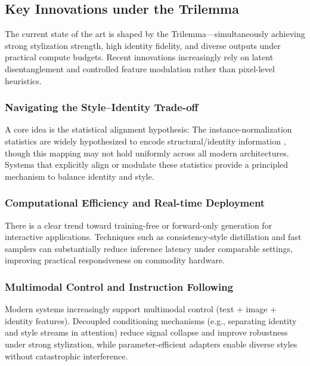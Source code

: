 \documentclass[journal]{IEEEtran}
\begin{document}
\subsection{Key Innovations under the Trilemma}
\label{sec:evaluation:innovations}
The current state of the art is shaped by the Trilemma---simultaneously achieving strong stylization strength, high identity fidelity, and diverse outputs under practical compute budgets. Recent innovations increasingly rely on latent disentanglement and controlled feature modulation rather than pixel-level heuristics.

\subsubsection{Navigating the Style--Identity Trade-off}
\label{sec:evaluation:innovations:tradeoff}
A core idea is the statistical alignment hypothesis: The instance-normalization statistics are widely hypothesized to encode structural/identity information \cite{huang2017arbitraryst}, though this mapping may not hold uniformly across all modern architectures. Systems that explicitly align or modulate these statistics provide a principled mechanism to balance identity and style.

\subsubsection{Computational Efficiency and Real-time Deployment}
\label{sec:evaluation:innovations:speed}
There is a clear trend toward training-free or forward-only generation for interactive applications. Techniques such as consistency-style distillation and fast samplers can substantially reduce inference latency under comparable settings, improving practical responsiveness on commodity hardware.

\subsubsection{Multimodal Control and Instruction Following}
\label{sec:evaluation:innovations:multimodal}
Modern systems increasingly support multimodal control (text + image + identity features). Decoupled conditioning mechanisms (e.g., separating identity and style streams in attention) reduce signal collapse and improve robustness under strong stylization, while parameter-efficient adapters enable diverse styles without catastrophic interference.
\end{document}
